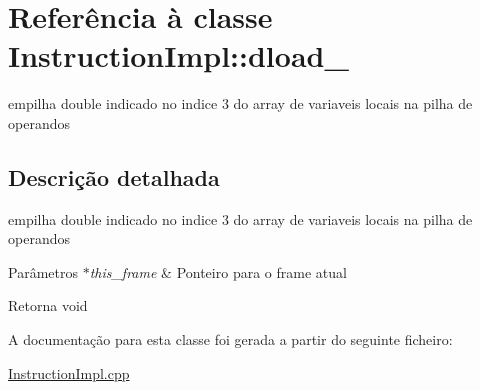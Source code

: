 \hypertarget{class_instruction_impl_1_1dload__3}{}\section{Referência à classe Instruction\+Impl\+:\+:dload\+\_}
\label{class_instruction_impl_1_1dload__3}


empilha double indicado no indice 3 do array de variaveis locais na pilha de operandos  




\subsection{Descrição detalhada}
empilha double indicado no indice 3 do array de variaveis locais na pilha de operandos 


\begin{DoxyParams}{Parâmetros}
{\em $\ast$this\+\_\+frame} & Ponteiro para o frame atual \\
\hline
\end{DoxyParams}
\begin{DoxyReturn}{Retorna}
void 
\end{DoxyReturn}


A documentação para esta classe foi gerada a partir do seguinte ficheiro\+:\begin{DoxyCompactItemize}
\item 
\hyperlink{_instruction_impl_8cpp}{Instruction\+Impl.\+cpp}\end{DoxyCompactItemize}
